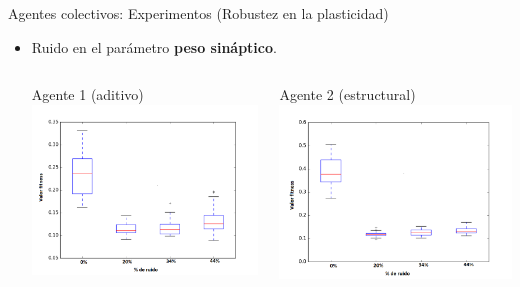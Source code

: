 \documentclass[aspectratio=169]{beamer}
\begin{document}
\begin{frame}{Agentes colectivos: Experimentos (Robustez en la plasticidad)}
  \begin{itemize}
    \item Ruido en el parámetro \textbf{peso sináptico}.
    \begin{columns}
      \begin{column}{0.47\textwidth}
        \begin{block}{Agente 1 (aditivo)}
        \includegraphics[width=1.0\textwidth,height=.6\textheight]{Imagenes/BoxPlotNW1}
      \end{block}
      \end{column}
      \begin{column}{0.5\textwidth}
        \begin{block}{Agente 2 (estructural)}
        \includegraphics[width=1.0\textwidth,height=.6\textheight]{Imagenes/BoxPlotNW2}
        \end{block}
      \end{column}
    \end{columns}
  \end{itemize}
\end{frame}
\end{document}
